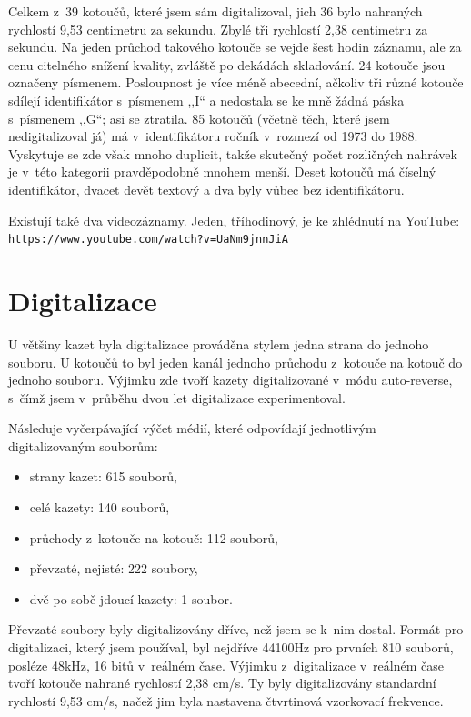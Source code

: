 Celkem z~39 kotoučů, které jsem sám digitalizoval, jich 36 bylo nahraných
rychlostí 9,53 centimetru za sekundu. Zbylé tři rychlostí 2,38 centimetru za sekundu. Na jeden
průchod takového kotouče se vejde šest hodin záznamu, ale za cenu citelného
snížení kvality, zvláště po dekádách skladování. 24 kotouče jsou označeny
písmenem. Posloupnost je více méně abecední, ačkoliv tři různé kotouče sdílejí
identifikátor s~písmenem ,,I`` a nedostala se ke mně žádná páska s~písmenem
,,G``; asi se ztratila. 85 kotoučů (včetně těch, které jsem nedigitalizoval já)
má v~identifikátoru ročník v~rozmezí od 1973 do 1988. Vyskytuje se zde však
mnoho duplicit, takže skutečný počet rozličných nahrávek je v~této kategorii
pravděpodobně mnohem menší. Deset kotoučů má číselný identifikátor, dvacet devět
textový a dva byly vůbec bez identifikátoru.

Existují také dva videozáznamy. Jeden, tříhodinový, je ke zhlédnutí na YouTube:
\texttt{https://www.youtube.com/watch?v=UaNm9jnnJiA}

\section{Digitalizace}
\label{sec:data:digitisation}

U většiny kazet byla digitalizace prováděna stylem jedna strana do jednoho
souboru. U kotoučů to byl jeden kanál jednoho průchodu z~kotouče na kotouč do
jednoho souboru. Výjimku zde tvoří kazety digitalizované v~módu auto-reverse,
s~čímž jsem v~průběhu dvou let digitalizace experimentoval.

Následuje vyčerpávající výčet médií, které odpovídají jednotlivým
digitalizovaným souborům:

\begin{itemize}
\item{strany kazet: 615 souborů,}
\item{celé kazety: 140 souborů,}
\item{průchody z~kotouče na kotouč: 112 souborů,}
\item{převzaté, nejisté: 222 soubory,}
\item{dvě po sobě jdoucí kazety: 1 soubor.}
\end{itemize}

Převzaté soubory byly digitalizovány dříve, než jsem se k~nim dostal. Formát pro digitalizaci, který jsem používal, byl
nejdříve 44100Hz pro prvních 810 souborů, posléze 48kHz,
16 bitů v~reálném čase. Výjimku z~digitalizace v~reálném čase tvoří
kotouče nahrané rychlostí 2,38 cm/s. Ty byly digitalizovány standardní
rychlostí 9,53 cm/s, načež jim byla nastavena čtvrtinová vzorkovací
frekvence.

